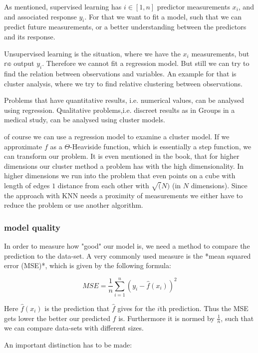 \documentclass{article}
\begin{document}
As mentioned, supervised learning has $i\in[1,n]$ predictor measurements $x_i$, and and associated response $y_i$. For that we want to fit a model, such that we can predict future measurements, or a better understanding between the predictors and its response.  
\par
Unsupervised learning is the situation, where we have the $x_i$ measurements, but $\mathbb{no}$ output $y_i$. Therefore we cannot fit a regression model. But still we can try to find the relation between observations and variables. An example for that is cluster analysis, where we try to find relative clustering between observations. \par

Problems that have quantitative results, i.e. numerical values, can be analysed using regression. Qualitative problems,i.e. discreet results as in Groups in a medical study, can be analysed using cluster models.  

of course we can use a regression model to examine a cluster model. If we approximate $f$ as a $\Theta$-Heaviside function, which is essentially a step function, we can transform our problem. It is even mentioned in the book, that for higher dimensions our cluster method a problem has with the high dimensionality. In higher dimensions we run into the problem that even points on a cube with length of edges $1$ distance from each other with $\sqrt(N)$ (in $N$ dimensions). Since the approach with KNN needs a proximity of measurements we either have to reduce the problem or use another algorithm.

\subsubsection{ model quality}
In order to measure how "good" our model is, we need a method to compare the prediction to the data-set. A very commonly used measure is the *mean squared error (MSE)*, which is given by the following formula:

\begin{equation}
MSE = \frac{1}{n} \sum _{i=1}^{n} (y_i - \hat{f}(x_i))^2
\end{equation}

Here $\hat{f}(x_i)$ is the prediction that $\hat f$ gives for the $i$th prediction. Thus the MSE gets lower the better our predicted $f$ is. Furthermore it is normed by $\frac{1}{n}$, such that we can compare data-sets with different sizes. \par
An important distinction has to be made: 
\end{document}
